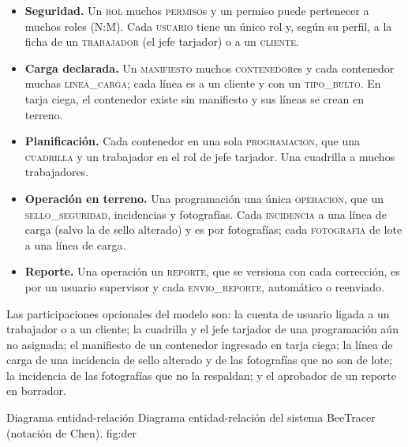 \begin{itemize}
    \item \textbf{Seguridad.} Un \textsc{rol}  muchos \textsc{permiso}s y un
    permiso puede pertenecer a muchos roles (N:M). Cada \textsc{usuario} tiene un único rol y,
    según su perfil,  a la ficha de un \textsc{trabajador} (el jefe tarjador)
    o  a un \textsc{cliente}.
    \item \textbf{Carga declarada.} Un \textsc{manifiesto}  muchos
    \textsc{contenedor}es y cada contenedor  muchas \textsc{linea\_carga}; cada
    línea es  a un cliente y  con un \textsc{tipo\_bulto}.
    En tarja ciega, el contenedor existe sin manifiesto y sus líneas se crean en terreno.
    \item \textbf{Planificación.} Cada contenedor  en una sola
    \textsc{programacion}, que  una \textsc{cuadrilla} y  un
    trabajador en el rol de jefe tarjador. Una cuadrilla  a muchos trabajadores.
    \item \textbf{Operación en terreno.} Una programación  una única
    \textsc{operacion}, que  un \textsc{sello\_seguridad}, 
    incidencias y  fotografías. Cada \textsc{incidencia}  a una
    línea de carga (salvo la de sello alterado) y es  por fotografías;
    cada \textsc{fotografia} de lote  a una línea de carga.
    \item \textbf{Reporte.} Una operación  un \textsc{reporte}, que se versiona
    con cada corrección, es  por un usuario supervisor y  cada
    \textsc{envio\_reporte}, automático o reenviado.
\end{itemize}

Las participaciones opcionales del modelo son: la cuenta de usuario ligada a un trabajador o
a un cliente; la cuadrilla y el jefe tarjador de una programación aún no asignada; el
manifiesto de un contenedor ingresado en tarja ciega; la línea de carga de una incidencia de
sello alterado y de las fotografías que no son de lote; la incidencia de las fotografías que
no la respaldan; y el aprobador de un reporte en borrador.

    {Diagrama entidad-relación}
    {Diagrama entidad-relación del sistema BeeTracer (notación de Chen).}
    {fig:der}

